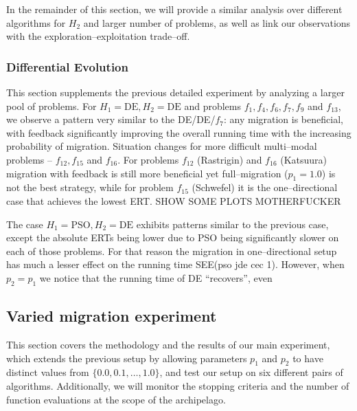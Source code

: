 \documentclass{sig-alternate}
\begin{document}
In the remainder of this section, we will provide a similar analysis over different algorithms for $H_2$ and  larger number of problems, as well as link our observations with the exploration--exploitation trade--off.

\subsubsection{Differential Evolution}
This section supplements the previous detailed experiment by analyzing a larger pool of problems.
For $H_1 =\mbox{DE}, H_2=\mbox{DE}$ and problems $f_1, f_4, f_6, f_7, f_9$ and $f_{13}$, we observe a pattern very similar to the DE/DE/$f_7$: any migration is beneficial, with feedback significantly improving the overall running time with the increasing probability of migration.
Situation changes for more difficult multi--modal problems -- $f_{12}, f_{15}$ and $f_{16}$.
For problems $f_{12}$ (Rastrigin) and $f_{16}$ (Katsuura) migration with feedback is still more beneficial yet full--migration ($p_1=1.0$) is not the best strategy, while for problem $f_{15}$ (Schwefel) it is the one--directional case that achieves the lowest ERT.
SHOW SOME PLOTS MOTHERFUCKER

The case $H_1 = \mbox{PSO}, H_2=\mbox{DE}$ exhibits patterns similar to the previous case, except the absolute ERTs being lower due to PSO being significantly slower on each of those problems.
For that reason the migration in one--directional setup has much a lesser effect on the running time SEE(pso jde cec 1).
However, when $p_2 = p_1$ we notice that the running time of DE ``recovers'', even


\subsection{Varied migration experiment}

This section covers the methodology and the results of our main experiment, which extends the previous setup by allowing parameters $p_1$ and $p_2$ to have distinct values from $\{0.0, 0.1, \ldots, 1.0\}$, and test our setup on six different pairs of algorithms.
Additionally, we will monitor the stopping criteria and the number of function evaluations at the scope of the archipelago.
\end{document}

